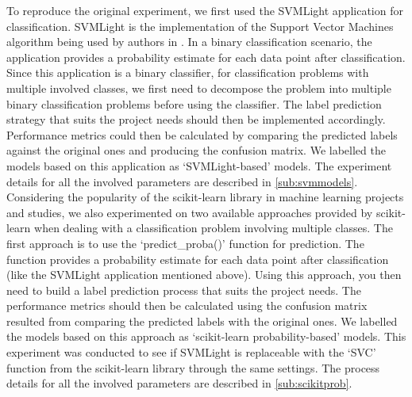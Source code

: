     To reproduce the original experiment, we first used the SVMLight application for classification. SVMLight is 
    the implementation of the Support Vector Machines algorithm being used by authors in \cite{mishra2014prediction}. 
    In a binary classification scenario, the application provides a probability estimate for each data point after classification. 
    Since this application is a binary classifier, for classification problems with multiple involved classes, we first need to 
    decompose the problem into multiple binary classification problems before using the classifier. The label prediction strategy 
    that suits the project needs should then be implemented accordingly. Performance metrics could then be calculated 
    by comparing the predicted labels against the original ones and producing the confusion matrix. 
    We labelled the models based on this application as `SVMLight-based' models. 
    The experiment details for all the involved parameters are described in \ref{sub:svmmodels}.\\
    
    Considering the popularity of the scikit-learn library in machine learning projects and studies, we also experimented on two 
    available approaches provided by scikit-learn when dealing with a classification problem involving multiple classes. The 
    first approach 
    is to use the `predict\_proba()' function for prediction. The function provides a probability estimate for each data point 
    after classification (like the SVMLight application mentioned above). Using this approach, you then need to build a 
    label prediction process that suits the project needs. The performance metrics should then be calculated using the confusion matrix 
    resulted from comparing the predicted labels with the original ones.
    We labelled the models based on this approach as `scikit-learn probability-based' models. 
    This experiment was conducted to see if SVMLight is replaceable with the `SVC' function from the scikit-learn library 
    through the same settings. The process details for all the involved parameters are described in \ref{sub:scikitprob}.\\
    
